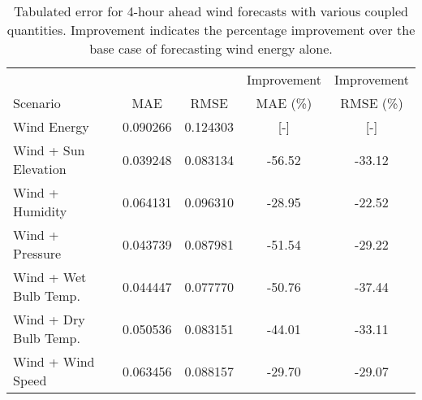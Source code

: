   \begin{table*}[t]
    \centering
    \caption{Tabulated error for 4-hour ahead wind forecasts with various coupled quantities. Improvement indicates the percentage improvement over the base case of forecasting wind energy alone.}
    \label{tab:wind04}
    \begin{tabular}{l|c|c|c|c}
      &  & & Improvement & Improvement \\
      Scenario  & MAE & RMSE & MAE (\%) & RMSE (\%)\\
      \hline
      Wind Energy & 0.090266 & 0.124303 & [-] & [-] \\
      Wind + Sun Elevation & 0.039248 & 0.083134 & -56.52& -33.12\\
      Wind + Humidity & 0.064131 & 0.096310 & -28.95& -22.52\\
      Wind + Pressure & 0.043739 & 0.087981 & -51.54& -29.22\\
      Wind + Wet Bulb Temp. & 0.044447 & 0.077770 & -50.76& -37.44\\
      Wind + Dry Bulb Temp. & 0.050536 & 0.083151 & -44.01 & -33.11\\
      Wind + Wind Speed & 0.063456 & 0.088157 & -29.70 & -29.07\\
    \end{tabular}
  \end{table*}
